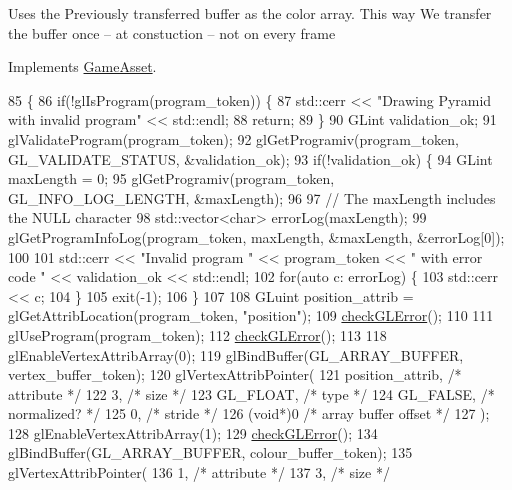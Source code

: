 Uses the Previously transferred buffer as the color array. This way We transfer the buffer once -- at constuction -- not on every frame

Implements \hyperlink{classGameAsset_a961aa51ca0a9961fc584c0b5d5431300}{Game\+Asset}.


\begin{DoxyCode}
85                                             \{
86   \textcolor{keywordflow}{if}(!glIsProgram(program\_token)) \{
87     std::cerr << \textcolor{stringliteral}{"Drawing Pyramid with invalid program"} << std::endl;
88     \textcolor{keywordflow}{return};
89   \}
90   GLint validation\_ok;
91   glValidateProgram(program\_token);
92   glGetProgramiv(program\_token, GL\_VALIDATE\_STATUS, &validation\_ok);
93   \textcolor{keywordflow}{if}(!validation\_ok) \{
94     GLint maxLength = 0;
95     glGetProgramiv(program\_token, GL\_INFO\_LOG\_LENGTH, &maxLength);
96 
97     \textcolor{comment}{// The maxLength includes the NULL character}
98     std::vector<char> errorLog(maxLength);
99     glGetProgramInfoLog(program\_token, maxLength, &maxLength, &errorLog[0]);
100 
101     std::cerr << \textcolor{stringliteral}{"Invalid program "} << program\_token << \textcolor{stringliteral}{" with error code "} << validation\_ok << std::endl;
102     \textcolor{keywordflow}{for}(\textcolor{keyword}{auto} c: errorLog) \{
103       std::cerr << c;
104     \}
105     exit(-1);
106   \}
107 
108   GLuint position\_attrib = glGetAttribLocation(program\_token, \textcolor{stringliteral}{"position"});
109   \hyperlink{PyramidAsset_8cc_a75f201b0e53e68726854997957322b8d}{checkGLError}();
110 
111   glUseProgram(program\_token);
112   \hyperlink{PyramidAsset_8cc_a75f201b0e53e68726854997957322b8d}{checkGLError}();
113 
118   glEnableVertexAttribArray(0);
119   glBindBuffer(GL\_ARRAY\_BUFFER, vertex\_buffer\_token);
120   glVertexAttribPointer(
121     position\_attrib,        \textcolor{comment}{/* attribute */}
122     3,        \textcolor{comment}{/* size */}
123     GL\_FLOAT,   \textcolor{comment}{/* type */}
124     GL\_FALSE,   \textcolor{comment}{/* normalized? */}
125     0,        \textcolor{comment}{/* stride */}
126     (\textcolor{keywordtype}{void}*)0    \textcolor{comment}{/* array buffer offset */}
127   );
128   glEnableVertexAttribArray(1);
129   \hyperlink{PyramidAsset_8cc_a75f201b0e53e68726854997957322b8d}{checkGLError}();
134   glBindBuffer(GL\_ARRAY\_BUFFER, colour\_buffer\_token);
135   glVertexAttribPointer(
136     1,        \textcolor{comment}{/* attribute */}
137     3,        \textcolor{comment}{/* size */}

\end{DoxyCode}
